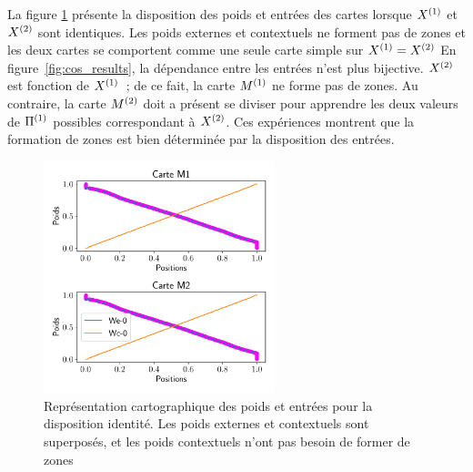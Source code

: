\documentclass[../main]{subfiles}
\begin{document}
La figure \ref{fig:id_results} présente la disposition des poids et entrées des cartes lorsque $X^{({1})}$ et $X^{({2})}$ sont identiques. Les poids externes et contextuels ne forment pas de zones et les deux cartes se comportent comme une seule carte simple sur $X^{({1})} = X^{({2})}$
En figure~\ref{fig:cos_results}, la dépendance entre les entrées n'est plus bijective. $X^{({2})}$ est fonction de $X^{({1})}$~; de ce fait, la carte $M^{({1})}$ ne forme pas de zones. Au contraire, la carte $M^{({2})}$ doit a présent se diviser pour apprendre les deux valeurs de $\Pi^{({1})}$ possibles correspondant à $X^{({2})}$. Ces expériences montrent que la formation de zones est bien déterminée par la disposition des entrées.

\begin{figure}
	\centering\includegraphics[width=0.6\textwidth]{2som_id_w.pdf}
	\caption{Représentation cartographique des poids et entrées pour la disposition identité. Les poids externes et contextuels sont superposés, et les poids contextuels n'ont pas besoin de former de zones \label{fig:id_results}}
	\end{figure}
	
\end{document}
